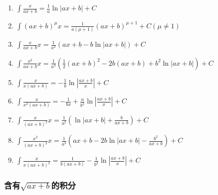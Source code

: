 \documentclass{book}
\begin{document}
\begin{enumerate}

\item $ \int \frac{ x}{ax+b} = \frac{1}{a} \ln |ax+b| + C $

\item $ \int (ax+b)^{\mu}  x = \frac{1}{a(\mu+1)}(ax+b)^{\mu+1} + C (\mu \neq 1) $

\item $ \int \frac{x}{ax+b}  x = \frac{1}{a^2} (ax+b-b\ln|ax+b|) + C $

\item $ \int \frac{x^2}{ax+b}  x = \frac{1}{a^3} \left( \frac{1}{2}(ax+b)^2-2b(ax+b)+b^2\ln|ax+b| \right) + C $

\item $ \int \frac{ x}{x(ax+b)} = -\frac{1}{b}\ln \left| \frac{ax+b}{x} \right| + C $

\item $ \int \frac{ x}{x^2(ax+b)} = -\frac{1}{bx} + \frac{a}{b^2}\ln\left| \frac{ax+b}{x} \right| + C $

\item $ \int \frac{x}{(ax+b)^2}  x = \frac{1}{a^2}\left( \ln|ax+b|+\frac{b}{ax+b} \right) + C $

\item $ \int \frac{x^2}{(ax+b)^2} x = \frac{1}{a^3} \left( ax+b-2b\ln|ax+b|-\frac{b^2}{ax+b} \right) + C $

\item $ \int \frac{ x}{x(ax+b)^2} = \frac{1}{b(ax+b)} - \frac{1}{b^2}\ln\left| \frac{ax+b}{x} \right| + C $

\end{enumerate}

\subsubsection{含有$\sqrt{ax+b}$的积分}
\end{document}
